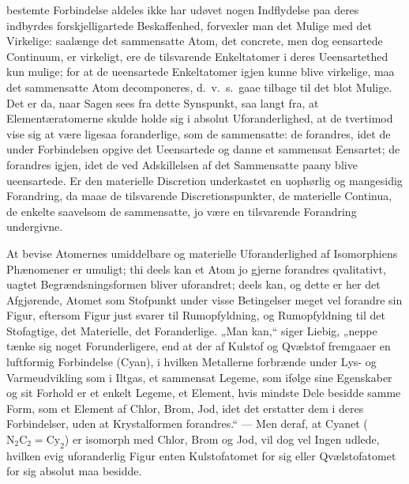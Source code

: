 \documentclass[12pt,a4paper]{book}
\begin{document}
bestemte Forbindelse aldeles ikke har udøvet nogen Indflydelse
paa deres indbyrdes forskjelligartede Beskaffenhed, forvexler
man det Mulige med det Virkelige: saalænge det sammensatte
Atom, det concrete, men dog eensartede Continuum, er
virkeligt, ere de tilsvarende Enkeltatomer i deres Ueensartethed
kun mulige; for at de ueensartede Enkeltatomer igjen
kunne blive virkelige, maa det sammensatte Atom decomponeres,
d.~v.~s.\ gaae tilbage til det blot Mulige. Det er da, naar
Sagen sees fra dette Synspunkt, saa langt fra, at
Elementæratomerne skulde holde sig i absolut Uforanderlighed, at de
tvertimod vise sig at være ligesaa foranderlige, som de
sammensatte: de forandres, idet de under Forbindelsen opgive det
Ueensartede og danne et sammensat Eensartet; de forandres
igjen, idet de ved Adskillelsen af det Sammensatte paany
blive ueensartede. Er den materielle Discretion underkastet
en uophørlig og mangesidig Forandring, da maae de tilsvarende
Discretionspunkter, de materielle Continua, de enkelte
saavelsom de sammensatte, jo være en tilsvarende Forandring
undergivne.

At bevise Atomernes umiddelbare og materielle
Uforanderlighed af Isomorphiens Phænomener er umuligt; thi
deels kan et Atom jo gjerne forandres qvalitativt, uagtet
Begrændsningsformen bliver uforandret; deels kan, og dette
er her det Afgjørende, Atomet som Stofpunkt under visse
Betingelser meget vel forandre sin Figur, eftersom Figur
just svarer til Rumopfyldning, og Rumopfyldning til det
Stofagtige, det Materielle, det Foranderlige. „Man kan,“
siger Liebig, „neppe tænke sig noget Forunderligere, end at
der af Kulstof og Qvælstof fremgaaer en luftformig
Forbindelse (Cyan), i hvilken Metallerne forbrænde under Lys- og
Varmeudvikling som i Iltgas, et sammensat Legeme, som ifølge
sine Egenskaber og sit Forhold er et enkelt Legeme, et Element,
hvis mindste Dele besidde samme Form, som et Element af Chlor,
Brom, Jod, idet det erstatter dem i deres Forbindelser, uden
at Krystalformen forandres.“ --- Men deraf, at Cyanet
($\mathrm{N}_2\mathrm{C}_2 = \mathrm{Cy}_2$) er isomorph
med Chlor, Brom og Jod, vil dog vel
Ingen udlede, hvilken evig uforanderlig Figur enten
Kulstofatomet for sig eller Qvælstofatomet for sig absolut maa
besidde.
\end{document}
